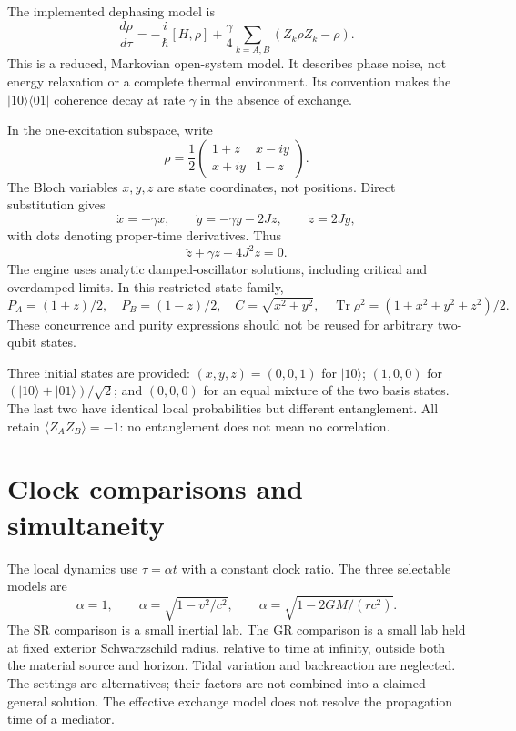 \documentclass[11pt,a4paper]{article}
\begin{document}
The implemented dephasing model is
\begin{equation}
\frac{d\rho}{d\tau}=-\frac{i}{\hbar}[H,\rho]
+\frac{\gamma}{4}\sum_{k=A,B}(Z_k\rho Z_k-\rho).
\end{equation}
This is a reduced, Markovian open-system model. It describes phase noise, not energy relaxation or a complete thermal environment. Its convention makes the $|10\rangle\langle01|$ coherence decay at rate $\gamma$ in the absence of exchange.

In the one-excitation subspace, write
\begin{equation}
\rho=\frac12\begin{pmatrix}1+z&x-iy\\x+iy&1-z\end{pmatrix}.
\end{equation}
The Bloch variables $x,y,z$ are state coordinates, not positions. Direct substitution gives
\begin{equation}
\dot x=-\gamma x,\qquad\dot y=-\gamma y-2Jz,\qquad\dot z=2Jy,
\end{equation}
with dots denoting proper-time derivatives. Thus
\begin{equation}
\ddot z+\gamma\dot z+4J^2z=0.
\end{equation}
The engine uses analytic damped-oscillator solutions, including critical and overdamped limits. In this restricted state family,
\begin{equation}
P_A=(1+z)/2,\quad P_B=(1-z)/2,\quad
C=\sqrt{x^2+y^2},\quad \operatorname{Tr}\rho^2=(1+x^2+y^2+z^2)/2.
\end{equation}
These concurrence and purity expressions should not be reused for arbitrary two-qubit states.

Three initial states are provided: $(x,y,z)=(0,0,1)$ for $|10\rangle$; $(1,0,0)$ for $(|10\rangle+|01\rangle)/\sqrt2$; and $(0,0,0)$ for an equal mixture of the two basis states. The last two have identical local probabilities but different entanglement. All retain $\langle Z_AZ_B\rangle=-1$: no entanglement does not mean no correlation.
\section{Clock comparisons and simultaneity}
The local dynamics use $\tau=\alpha t$ with a constant clock ratio. The three selectable models are
\begin{equation}
\alpha=1,\qquad
\alpha=\sqrt{1-v^2/c^2},\qquad
\alpha=\sqrt{1-2GM/(rc^2)}.
\end{equation}
The SR comparison is a small inertial lab. The GR comparison is a small lab held at fixed exterior Schwarzschild radius, relative to time at infinity, outside both the material source and horizon. Tidal variation and backreaction are neglected. The settings are alternatives; their factors are not combined into a claimed general solution. The effective exchange model does not resolve the propagation time of a mediator.
\end{document}
